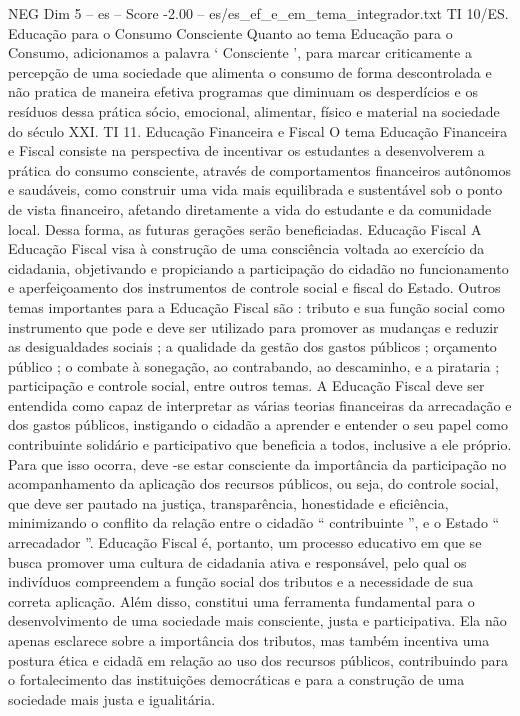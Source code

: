 \begin{textsample}{NEG Dim 5 – es – Score -2.00 – es/es\_ef\_e\_em\_tema\_integrador.txt}
TI 10/ES.
Educação para o Consumo Consciente Quanto ao tema Educação para o Consumo, adicionamos a palavra ‘ Consciente ’, para marcar criticamente a percepção de uma sociedade que alimenta o consumo de forma descontrolada e não pratica de maneira efetiva programas que diminuam os desperdícios e os resíduos dessa prática sócio, emocional, alimentar, físico e material na sociedade do século XXI.
TI 11.
Educação Financeira e Fiscal O tema Educação Financeira e Fiscal consiste na perspectiva de incentivar os estudantes a desenvolverem a prática do consumo consciente, através de comportamentos financeiros autônomos e saudáveis, como construir uma vida mais equilibrada e sustentável sob o ponto de vista financeiro, afetando diretamente a vida do estudante e da comunidade local.
Dessa forma, as futuras gerações serão beneficiadas.
Educação Fiscal A Educação Fiscal visa à construção de uma consciência voltada ao exercício da cidadania, objetivando e propiciando a participação do cidadão no funcionamento e aperfeiçoamento dos instrumentos de controle social e fiscal do Estado.
Outros temas importantes para a Educação Fiscal são : tributo e sua função social como instrumento que pode e deve ser utilizado para promover as mudanças e reduzir as desigualdades sociais ; a qualidade da gestão dos gastos públicos ; orçamento público ; o combate à sonegação, ao contrabando, ao descaminho, e a pirataria ; participação e controle social, entre outros temas.
A Educação Fiscal deve ser entendida como capaz de interpretar as várias teorias financeiras da arrecadação e dos gastos públicos, instigando o cidadão a aprender e entender o seu papel como contribuinte solidário e participativo que beneficia a todos, inclusive a ele próprio.
Para que isso ocorra, deve -se estar consciente da importância da participação no acompanhamento da aplicação dos recursos públicos, ou seja, do controle social, que deve ser pautado na justiça, transparência, honestidade e eficiência, minimizando o conflito da relação entre o cidadão “ contribuinte ”, e o Estado “ arrecadador ”.
Educação Fiscal é, portanto, um processo educativo em que se busca promover uma cultura de cidadania ativa e responsável, pelo qual os indivíduos compreendem a função social dos tributos e a necessidade de sua correta aplicação.
Além disso, constitui uma ferramenta fundamental para o desenvolvimento de uma sociedade mais consciente, justa e participativa.
Ela não apenas esclarece sobre a importância dos tributos, mas também incentiva uma postura ética e cidadã em relação ao uso dos recursos públicos, contribuindo para o fortalecimento das instituições democráticas e para a construção de uma sociedade mais justa e igualitária.

\end{textsample}
